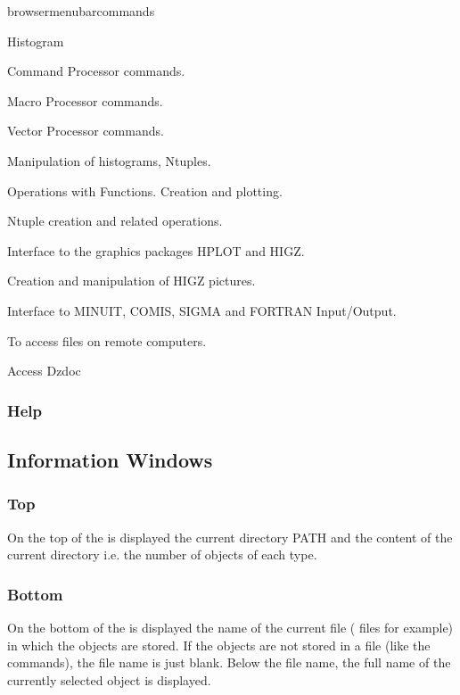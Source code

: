 \begin{PAWf}[.15]{browsermenubarcommands}
\begin{DLsf}{Histogram}
\item[Kuip]         Command Processor commands.
\item[Macro]        Macro Processor commands.
\item[Vector]       Vector Processor commands.
\item[Histogram]    Manipulation of histograms, Ntuples.
\item[Function]     Operations with Functions. Creation and plotting.
\item[Ntuple]       Ntuple creation and related operations.
\item[Graphics]     Interface to the graphics packages HPLOT and HIGZ.
\item[Picture]      Creation and manipulation of HIGZ pictures.
\item[Fortran]      Interface to MINUIT, COMIS, SIGMA and FORTRAN Input/Output.
\item[Network]      To access files on remote computers.
\item[Dzdoc]        Access Dzdoc
\end{DLsf}
\end{PAWf}

\subsubsection{Help}

\subsection{Information Windows}

\subsubsection{Top}


On the top of the \MB{} is displayed the current directory PATH and
the content of the current directory i.e. the number of objects of each
type.

\subsubsection{Bottom}


On the bottom of the \MB{} is displayed the name of the current
file (\HBOOK{} files for example) in which the objects are stored.
If the objects are not stored in a file (like the commands), the
file name is just blank. Below the file name, the full name of the
currently selected object is displayed.

